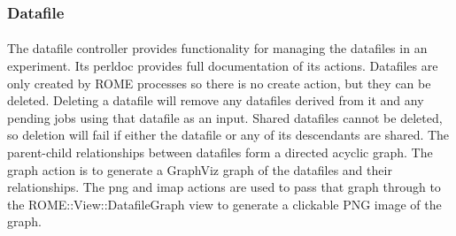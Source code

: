 \subsubsection{Datafile}
\label{sec:controller_datafile}

\paragraph{}
The datafile controller provides functionality for managing the datafiles in an experiment. Its perldoc provides full documentation of its actions. Datafiles are only created by ROME processes so there is no create action, but they can be deleted. Deleting a datafile will remove any datafiles derived from it and any pending jobs using that datafile as an input. Shared datafiles cannot be deleted, so deletion will fail if either the datafile or any of its descendants are shared. The parent-child relationships between datafiles form a directed acyclic graph. The graph action is to generate a GraphViz graph of the datafiles and their relationships. The png and imap actions are used to pass that graph through to the ROME::View::DatafileGraph view to generate a clickable PNG image of the graph.


% 

